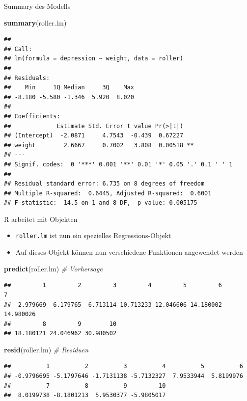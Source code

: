 \documentclass[ignorenonframetext,]{beamer}
\newenvironment{Shaded}{}{}
\newcommand{\KeywordTok}[1]{\textcolor[rgb]{0.00,0.44,0.13}{\textbf{{#1}}}}
\newcommand{\CommentTok}[1]{\textcolor[rgb]{0.38,0.63,0.69}{\textit{{#1}}}}
\newcommand{\NormalTok}[1]{{#1}}
\providecommand{\tightlist}{%
\setlength{\itemsep}{0pt}\setlength{\parskip}{0pt}}
\begin{document}
\begin{frame}[fragile]{Summary des Modells}

\begin{Shaded}
\begin{Highlighting}[]
\KeywordTok{summary}\NormalTok{(roller.lm)}
\end{Highlighting}
\end{Shaded}

\begin{verbatim}
## 
## Call:
## lm(formula = depression ~ weight, data = roller)
## 
## Residuals:
##    Min     1Q Median     3Q    Max 
## -8.180 -5.580 -1.346  5.920  8.020 
## 
## Coefficients:
##             Estimate Std. Error t value Pr(>|t|)   
## (Intercept)  -2.0871     4.7543  -0.439  0.67227   
## weight        2.6667     0.7002   3.808  0.00518 **
## ---
## Signif. codes:  0 '***' 0.001 '**' 0.01 '*' 0.05 '.' 0.1 ' ' 1
## 
## Residual standard error: 6.735 on 8 degrees of freedom
## Multiple R-squared:  0.6445, Adjusted R-squared:  0.6001 
## F-statistic:  14.5 on 1 and 8 DF,  p-value: 0.005175
\end{verbatim}

\end{frame}

\begin{frame}[fragile]{R arbeitet mit Objekten}

\begin{itemize}
\tightlist
\item
  \texttt{roller.lm} ist nun ein spezielles Regressions-Objekt
\item
  Auf dieses Objekt können nun verschiedene Funktionen angewendet werden
\end{itemize}

\begin{Shaded}
\begin{Highlighting}[]
\KeywordTok{predict}\NormalTok{(roller.lm) }\CommentTok{# Vorhersage}
\end{Highlighting}
\end{Shaded}

\begin{verbatim}
##         1         2         3         4         5         6         7 
##  2.979669  6.179765  6.713114 10.713233 12.046606 14.180002 14.980026 
##         8         9        10 
## 18.180121 24.046962 30.980502
\end{verbatim}

\begin{Shaded}
\begin{Highlighting}[]
\KeywordTok{resid}\NormalTok{(roller.lm) }\CommentTok{# Residuen}
\end{Highlighting}
\end{Shaded}

\begin{verbatim}
##          1          2          3          4          5          6 
## -0.9796695 -5.1797646 -1.7131138 -5.7132327  7.9533944  5.8199976 
##          7          8          9         10 
##  8.0199738 -8.1801213  5.9530377 -5.9805017
\end{verbatim}

\end{frame}
\end{document}
